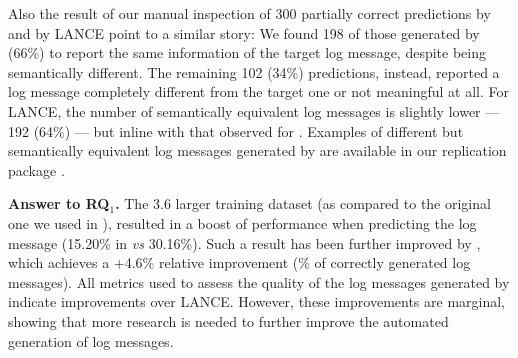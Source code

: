Also the result of our manual inspection of 300 partially correct predictions by \approach and by LANCE point to a similar story: We found 198 of those generated by \approach (66\%) to report the same information of the target log message, despite being semantically different. The remaining 102 (34\%) predictions, instead, reported a log message completely different from the target one or not meaningful at all. For LANCE, the number of semantically equivalent log messages is slightly lower --- 192 (64\%) --- but inline with that observed for \approach. Examples of different but semantically equivalent log messages generated by \approach are available in our replication package \cite{replication}.



\vspace{0.2cm}
\begin{resultbox}
\textbf{Answer to RQ$_1$.} The 3.6 larger training dataset (as compared to the original one we used in \cite{mastropaolo2022using}), resulted in a boost of performance when predicting the log message (15.20\% in \cite{mastropaolo2022using} \emph{vs} 30.16\%). Such a result has been further improved by \approach, which achieves a +4.6\% relative improvement (\% of correctly generated log messages). All metrics used to assess the quality of the log messages generated by \approach indicate improvements over LANCE. However, these improvements are marginal, showing that more research is needed to further improve the automated generation of log messages.
\end{resultbox}



